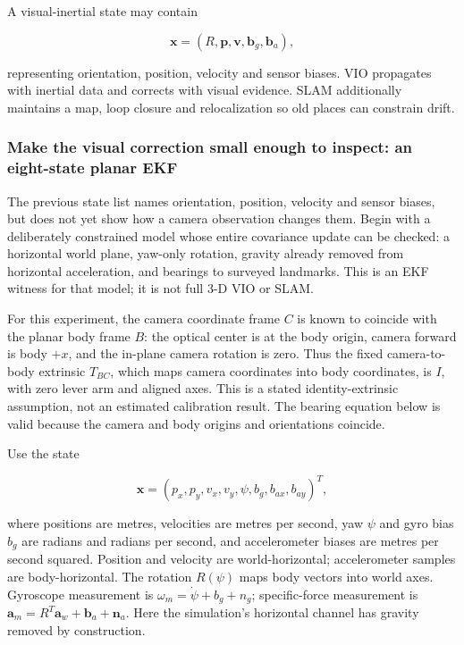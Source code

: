 A visual-inertial state may contain

\[
\mathbf{x}=(R,\mathbf{p},\mathbf{v},\mathbf{b}_g,\mathbf{b}_a),
\]

representing orientation, position, velocity and sensor biases. VIO propagates with inertial data and corrects with visual evidence. SLAM additionally maintains a map, loop closure and relocalization so old places can constrain drift.

\subsubsection{Make the visual correction small enough to inspect: an eight-state planar EKF}\label{make-the-visual-correction-small-enough-to-inspect-an-eight-state-planar-ekf}

The previous state list names orientation, position, velocity and sensor biases, but does not yet show how a camera observation changes them. Begin with a deliberately constrained model whose entire covariance update can be checked: a horizontal world plane, yaw-only rotation, gravity already removed from horizontal acceleration, and bearings to surveyed landmarks. This is an EKF witness for that model; it is not full 3-D VIO or SLAM.

For this experiment, the camera coordinate frame \(C\) is known to coincide with the planar body frame \(B\): the optical center is at the body origin, camera forward is body \(+x\), and the in-plane camera rotation is zero. Thus the fixed camera-to-body extrinsic \(T_{BC}\), which maps camera coordinates into body coordinates, is \(I\), with zero lever arm and aligned axes. This is a stated identity-extrinsic assumption, not an estimated calibration result. The bearing equation below is valid because the camera and body origins and orientations coincide.

Use the state

\[
\mathbf{x}=(p_x,p_y,v_x,v_y,\psi,b_g,b_{ax},b_{ay})^T,
\]

where positions are metres, velocities are metres per second, yaw \(\psi\) and gyro bias \(b_g\) are radians and radians per second, and accelerometer biases are metres per second squared. Position and velocity are world-horizontal; accelerometer samples are body-horizontal. The rotation \(R(\psi)\) maps body vectors into world axes. Gyroscope measurement is \(\omega_m=\dot\psi+b_g+n_g\); specific-force measurement is \(\mathbf{a}_m=R^T\mathbf{a}_w+\mathbf{b}_a+\mathbf{n}_a\). Here the simulation's horizontal channel has gravity removed by construction.

